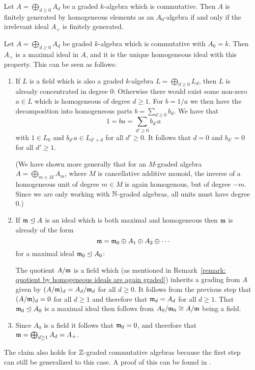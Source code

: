 \begin{corollary}
  \label{corollary: finite homogeneous generatiors for irrelevant ideal}
  Let $A = \bigoplus_{d \geq 0} A_d$ be a graded $k$-algebra which is commutative.
  Then $A$ is finitely generated by homogeneous elements as an $A_0$-algebra if and only if the irrelevant ideal $A_+$ is finitely generated.
\end{corollary}


\begin{remark}
  Let $A = \bigoplus_{d \geq 0} A_d$ be graded $k$-algebra which is commutative with $A_0 = k$.
  Then $A_+$ is a maximal ideal in $A$, and it is the unique homogeneous ideal with this property.
  This can be seen as follows:
  \begin{enumerate}[label=\arabic*)]
    \item
      If $L$ is a field which is also a graded $k$-algebra $L = \bigoplus_{d \geq 0} L_d$, then $L$ is already concentrated in degree $0$:
      Otherwise there would exist some non-zero $a \in L$ which is homogeneous of degree $d \geq 1$.
      For $b = 1/a$ we then have the decomposition into homogeneous parts $b = \sum_{d \geq 0} b_d$.
      We have that
      \[
          1
        = b a
        = \sum_{d' \geq 0} b_{d'} a
      \]
      with $1 \in L_0$ and $b_{d'} a \in L_{d' + d}$ for all $d' \geq 0$.
      It follows that $d = 0$ and $b_{d'} = 0$ for all $d' \geq 1$.
      
      (We have shown more generally that for an $M$-graded algebra $A = \bigoplus_{m \in M} A_m$, where $M$ is cancellative additive monoid, the inverse of a homogeneous unit of degree $m \in M$ is again homogenous, but of degree $-m$.
      Since we are only working with $\mathbb{N}$-graded algebras, all units must have degree $0$.)
    \item
      If $\mathfrak{m} \trianglelefteq A$ is an ideal which is both maximal and homogeneous then $\mathfrak{m}$ is already of the form
      \[
          \mathfrak{m}
        = \mathfrak{m}_0 \oplus A_1 \oplus A_2 \oplus \dotsb
      \]
      for a maximal ideal $\mathfrak{m}_0 \trianglelefteq A_0$:
      
      The quotient $A/\mathfrak{m}$ is a field which (as mentioned in Remark~\ref{remark: quotient by homogeneous ideals are again graded}) inherits a grading from $A$ given by $(A/\mathfrak{m})_d = A_d / \mathfrak{m}_d$ for all $d \geq 0$.
      It follows from the previous step that $(A/\mathfrak{m})_d = 0$ for all $d \geq 1$ and therefore that $\mathfrak{m}_d = A_d$ for all $d \geq 1$.
      That $\mathfrak{m}_0 \trianglelefteq A_0$ is a maximal ideal then follows from $A_0/\mathfrak{m}_0 \cong A/\mathfrak{m}$ being a field.
    \item
      Since $A_0$ is a field it follows that $\mathfrak{m}_0 = 0$, and therefore that $\mathfrak{m} = \bigoplus_{d \geq 1} A_d = A_+$.
  \end{enumerate}
  The claim also holds for $\mathbb{Z}$-graded commutative algebras because the first step can still be generalized to this case.
  A proof of this can be found in \cite[Remark 1.3.10]{GradedRings2004}.
\end{remark}


